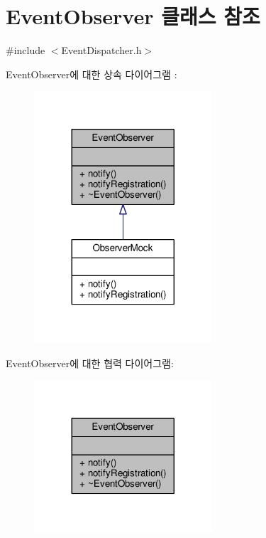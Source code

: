 \hypertarget{class_event_observer}{}\section{Event\+Observer 클래스 참조}
\label{class_event_observer}


{\ttfamily \#include $<$Event\+Dispatcher.\+h$>$}



Event\+Observer에 대한 상속 다이어그램 \+: 
\nopagebreak
\begin{figure}[H]
\begin{center}
\leavevmode
\includegraphics[width=188pt]{class_event_observer__inherit__graph}
\end{center}
\end{figure}


Event\+Observer에 대한 협력 다이어그램\+:
\nopagebreak
\begin{figure}[H]
\begin{center}
\leavevmode
\includegraphics[width=188pt]{class_event_observer__coll__graph}
\end{center}
\end{figure}
